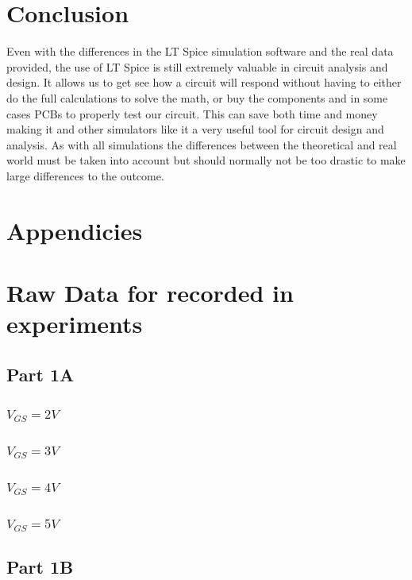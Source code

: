 \documentclass[titlepage, 12pt]{article}
\begin{document}
    \section{Conclusion}
    Even with the differences in the LT Spice simulation software and
    the real data provided, the use of LT Spice is still extremely
    valuable in circuit analysis and design. It allows us to get see how
    a circuit will respond without having to either do the full
    calculations to solve the math, or buy the components and in some
    cases PCBs to properly test our circuit. This can save both time and
    money making it and other simulators like it a very useful tool for
    circuit design and analysis. As with all simulations the differences
    between the theoretical and real world must be taken into account
    but should normally not be too drastic to make large differences to
    the outcome.

    \appendix
    \section*{Appendicies}
    \section{Raw Data for recorded in experiments}\label{sec:data}
    \subsection{Part 1A}
    \subsubsection{$V_{GS} = 2V$}
    
    \subsubsection{$V_{GS} = 3V$}
    
    \subsubsection{$V_{GS} = 4V$}
    
    \subsubsection{$V_{GS} = 5V$}
    
    \subsection{Part 1B}
\end{document}
